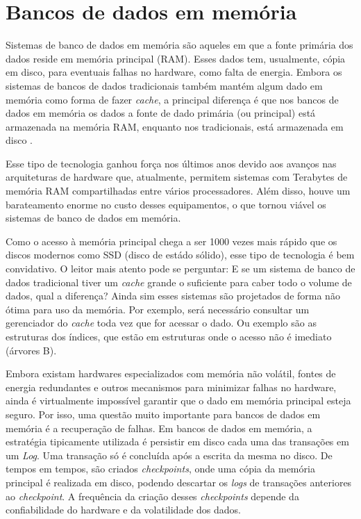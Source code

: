 \section{Bancos de dados em memória}

Sistemas de banco de dados em memória são aqueles em que a fonte primária dos dados reside em memória principal (RAM). Esses dados tem, usualmente, cópia em disco, para eventuais falhas no hardware, como falta de energia. Embora os sistemas de bancos de dados tradicionais também mantém algum dado em memória como forma de fazer \textit{cache}, a principal diferença é que nos bancos de dados em memória os dados a fonte de dado primária (ou principal) está armazenada na memória RAM, enquanto nos tradicionais, está armazenada em disco \cite{garcia1992main}.

Esse tipo de tecnologia ganhou força nos últimos anos devido aos avanços nas arquiteturas de hardware que, atualmente, permitem sistemas com Terabytes de memória RAM compartilhadas entre vários processadores. Além disso, houve um barateamento enorme no custo desses equipamentos, o que tornou viável os sistemas de banco de dados em memória. 

Como o acesso à memória principal chega a ser 1000 vezes mais rápido que os discos modernos como SSD (disco de estádo sólido), esse tipo de tecnologia é bem convidativo. O leitor mais atento pode se perguntar: E se um sistema de banco de dados tradicional tiver um \textit{cache} grande o suficiente para caber todo o volume de dados, qual a diferença? Ainda sim esses sistemas são projetados de forma não ótima para uso da memória. Por exemplo, será necessário consultar um gerenciador do \textit{cache} toda vez que for acessar o dado. Ou exemplo são as estruturas dos índices, que estão em estruturas onde o acesso não é imediato (árvores B). 

Embora existam hardwares especializados com memória não volátil, fontes de energia redundantes e outros mecanismos para minimizar falhas no hardware, ainda é virtualmente impossível garantir que o dado em memória principal esteja seguro. Por isso, uma questão muito importante para bancos de dados em memória é a recuperação de falhas. Em bancos de dados em memória, a estratégia tipicamente utilizada é persistir em disco cada uma das transações em um \textit{Log}. Uma transação só é concluída após a escrita da mesma no disco. De tempos em tempos, são criados \textit{checkpoints}, onde uma cópia da memória principal é realizada em disco, podendo descartar os \textit{logs} de transações anteriores ao \textit{checkpoint}. A frequência da criação desses \textit{checkpoints} depende da confiabilidade do hardware e da volatilidade dos dados.

